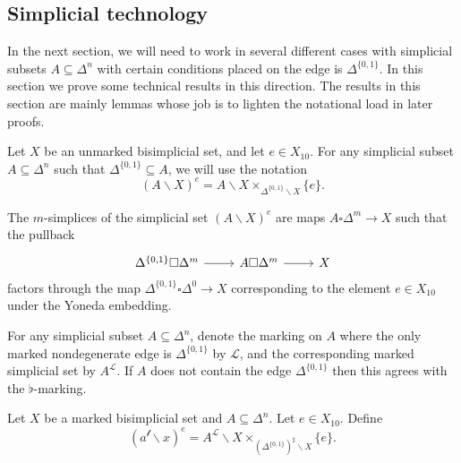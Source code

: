 \documentclass[main.tex]{subfiles}
\begin{document}
\subsection{Simplicial technology}
\label{ssc:simplicial_technology}

In the next section, we will need to work in several different cases with simplicial subsets $A \subseteq \Delta^{n}$ with certain conditions placed on the edge is $\Delta^{\{0, 1\}}$. In this section we prove some technical results in this direction. The results in this section are mainly lemmas whose job is to lighten the notational load in later proofs.

\begin{notation}
  Let $X$ be an unmarked bisimplicial set, and let $e \in X_{10}$. For any simplicial subset $A \subseteq \Delta^{n}$ such that $\Delta^{\{0, 1\}} \subseteq A$, we will use the notation
  \begin{equation*}
    (A \backslash X)^{e} = A \backslash X \times_{\Delta^{\{0, 1\}} \backslash X} \{e\}.
  \end{equation*}
\end{notation}

The $m$-simplices of the simplicial set $(A \backslash X)^{e}$ are maps $A \square \Delta^{m} \to X$ such that the pullback
\begin{equation*}
  \begin{tikzcd}
    \Delta^{\{0, 1\}} \square \Delta^{m} 
    \arrow[r]
    & A \square \Delta^{m} 
    \arrow[r]
    & X
  \end{tikzcd}
\end{equation*}
factors through the map $\Delta^{\{0, 1\}} \square \Delta^{0} \to X$ corresponding to the element $e \in X_{10}$ under the Yoneda embedding.

\begin{definition}
  For any simplicial subset $A \subseteq \Delta^{n}$, denote the marking on $A$ where the only marked nondegenerate edge is $\Delta^{\{0, 1\}}$ by $\mathcal{L}$, and the corresponding marked simplicial set by $A^{\mathcal{L}}$. If $A$ does not contain the edge $\Delta^{\{0, 1\}}$ then this agrees with the $\flat$-marking.
\end{definition}

Let $X$ be a marked bisimplicial set and $A \subseteq \Delta^{n}$. Let $e \in X_{10}$. Define
\begin{equation*}
  (a^{\mathcal{l}} \backslash x)^{e} = A^{\mathcal{L}} \backslash X \times_{(\Delta^{\{0, 1\}})^{\sharp} \backslash X} \{e\}.
\end{equation*}
\end{document}
